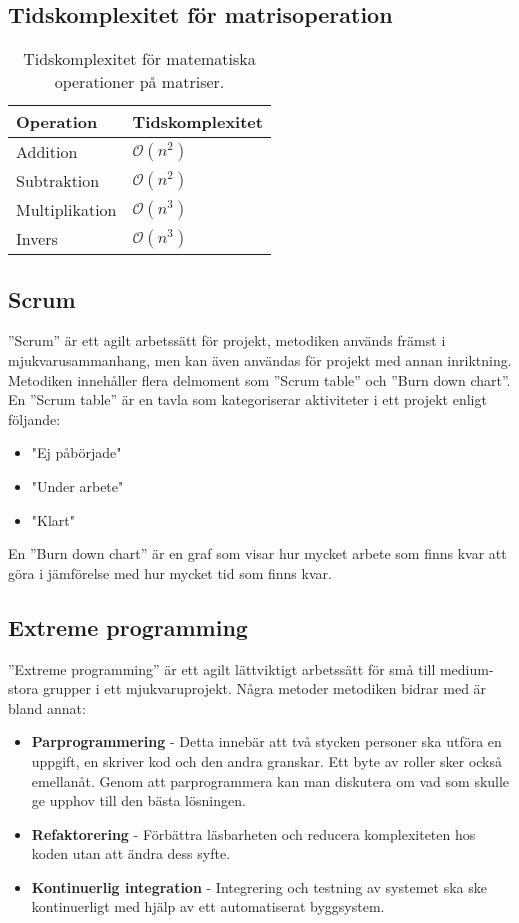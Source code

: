 \subsection{Tidskomplexitet för matrisoperation}
\begin{table}[h]
  \centering
  \begin{tabular}{|l|l|}
    \hline
    \textbf{Operation} & \textbf{Tidskomplexitet} \\ \hline
    Addition & $\mathcal{O}(n^2)$ \\ \hline
    Subtraktion & $\mathcal{O}(n^2)$\\ \hline
    Multiplikation & $\mathcal{O}(n^3)$\\ \hline
    Invers  & $\mathcal{O}(n^3)$\\ \hline
  \end{tabular}
  \caption{Tidskomplexitet för matematiska operationer på matriser.}
  \label{tabell:matrisopkomplexitet}
\end{table}
\citep{razvan}
\subsection{Scrum}
''Scrum'' är ett agilt arbetssätt för projekt, metodiken används främst i mjukvarusammanhang, men kan även användas för projekt med annan inriktning. Metodiken innehåller flera delmoment som ''Scrum table'' och ''Burn down chart''. En ''Scrum table'' är en tavla som kategoriserar aktiviteter i ett projekt enligt följande: 
\begin{itemize}
  \item "Ej påbörjade"
  \item "Under arbete"
  \item "Klart"
\end{itemize} 
En ''Burn down chart'' är en graf som visar hur mycket arbete som finns kvar att göra i jämförelse med hur mycket tid som finns kvar. \citep{scrum}

\subsection{Extreme programming}
''Extreme programming'' är ett agilt lättviktigt arbetssätt för små till medium-stora grupper i ett mjukvaruprojekt. Några metoder metodiken bidrar med är bland annat:     
\begin{itemize}
\item \textbf{Parprogrammering} - Detta innebär att två stycken personer ska utföra en uppgift, en skriver kod och den andra granskar. Ett byte av roller sker också emellanåt. Genom att parprogrammera kan man diskutera om vad som skulle ge upphov till den bästa lösningen. 
\item \textbf{Refaktorering} - Förbättra läsbarheten och reducera komplexiteten hos koden utan att ändra dess syfte.
\item \textbf{Kontinuerlig integration} - Integrering och testning av systemet ska ske kontinuerligt med hjälp av ett automatiserat byggsystem. 
\end{itemize}
\citep{kristiansandahl}
